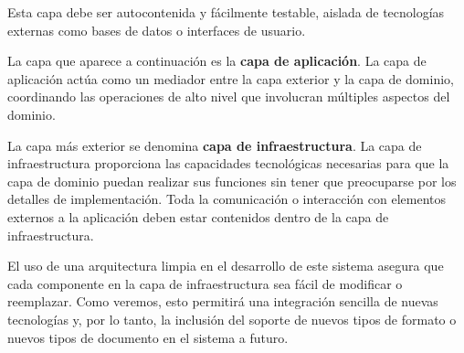 Esta capa debe ser autocontenida y fácilmente testable, aislada de tecnologías externas como bases de datos o
interfaces de usuario.

La capa que aparece a continuación es la \textbf{capa de aplicación}.
La capa de aplicación actúa como un mediador entre la capa exterior y la capa de dominio, coordinando las operaciones
de alto nivel que involucran múltiples aspectos del dominio.

La capa más exterior se denomina \textbf{capa de infraestructura}.
La capa de infraestructura proporciona las capacidades tecnológicas necesarias para que la capa de dominio puedan
realizar sus funciones sin tener que preocuparse por los detalles de implementación.
Toda la comunicación o interacción con elementos externos a la aplicación deben estar contenidos dentro de la capa de
infraestructura.

El uso de una arquitectura limpia en el desarrollo de este sistema asegura que cada componente en la capa de
infraestructura sea fácil de modificar o reemplazar.
Como veremos, esto permitirá una integración sencilla de nuevas tecnologías y, por lo tanto, la inclusión del soporte
de nuevos tipos de formato o nuevos tipos de documento en el sistema a futuro.